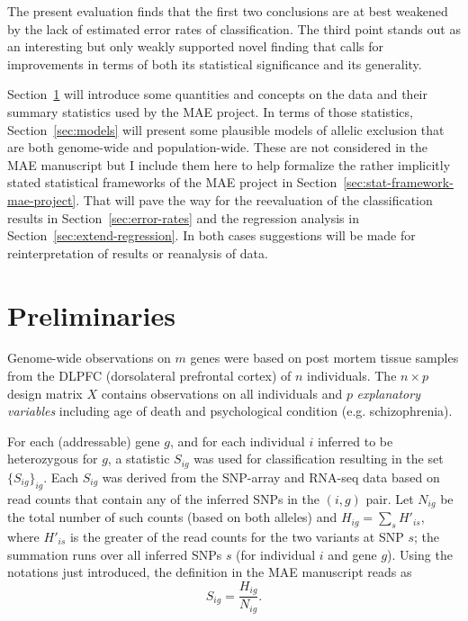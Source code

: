 \documentclass[letterpaper]{article}
\begin{document}
The present evaluation finds that the first two conclusions are at best
weakened by the lack of estimated error rates of classification.  The third
point stands out as an interesting but only weakly supported novel finding
that calls for improvements in terms of both its statistical significance and
its generality.

Section~\ref{sec:preliminaries} will introduce some quantities and concepts on
the data and their summary statistics used by the MAE project.  In terms of
those statistics, Section~\ref{sec:models} will present some plausible models
of allelic exclusion that are both genome-wide and population-wide.  These are
not considered in the MAE manuscript but I include them here to help formalize
the rather implicitly stated statistical frameworks of the MAE project in
Section~\ref{sec:stat-framework-mae-project}.  That will pave the way for the
reevaluation of the classification results in Section~\ref{sec:error-rates}
and the regression analysis in Section~\ref{sec:extend-regression}.  In both
cases suggestions will be made for reinterpretation of results or reanalysis
of data.

\section{Preliminaries}
\label{sec:preliminaries}

Genome-wide observations on $m$ genes were based on post mortem tissue samples from the DLPFC
(dorsolateral prefrontal cortex) of $n$ individuals. The $n \times p$ design
matrix $X$ contains observations on all individuals and $p$ \emph{explanatory variables} including age of death and psychological condition (e.g.
schizophrenia).

For each (addressable) gene $g$, and for each individual $i$ inferred to be
heterozygous for \(g\), a statistic $S_{ig}$ was used for classification
resulting in the set \(\{S_{ig}\}_{ig}\).  Each $S_{ig}$ was derived from the
SNP-array and RNA-seq data based on read counts that contain any of the
inferred SNPs in the \((i,g)\) pair.  Let \(N_{ig}\) be the total number of
such counts (based on both alleles) and \(H_{ig} = \sum_{s} H'_{is}\), where
\(H'_{is}\) is the greater of the read counts for the two variants at SNP
\(s\); the summation runs over all inferred SNPs \(s\) (for individual \(i\)
and gene \(g\)).  Using the notations just introduced, the definition in the
MAE manuscript reads as
\begin{equation}
\label{eq:S}
S_{ig} = \frac{H_{ig}}{N_{ig}}.
\end{equation}
\end{document}
